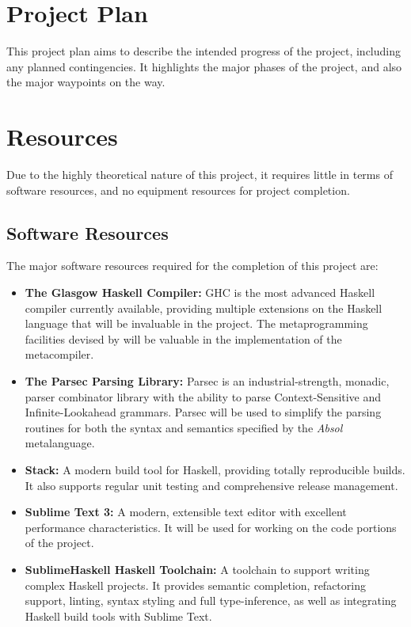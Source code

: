 \documentclass[a4paper,11pt]{report}
\begin{document}
\chapter{Project Plan} %
\label{cha:project_plan}
This project plan aims to describe the intended progress of the project, including any planned contingencies.
It highlights the major phases of the project, and also the major waypoints on the way.



\chapter{Resources} %
\label{cha:resources}
Due to the highly theoretical nature of this project, it requires little in terms of software resources, and no equipment resources for project completion.

\section{Software Resources} %
\label{sec:software_resources}
The major software resources required for the completion of this project are:
\begin{itemize}
    \item \textbf{The Glasgow Haskell Compiler:} GHC is the most advanced Haskell compiler currently available, providing multiple extensions on the Haskell language that will be invaluable in the project.
    The metaprogramming facilities devised by \cite{sheard2002template} will be valuable in the implementation of the metacompiler. 
    \item \textbf{The Parsec Parsing Library:} Parsec is an industrial-strength, monadic, parser combinator library with the ability to parse Context-Sensitive and Infinite-Lookahead grammars.
    Parsec will be used to simplify the parsing routines for both the syntax and semantics specified by the \textit{Absol} metalanguage.
    \item \textbf{Stack:} A modern build tool for Haskell, providing totally reproducible builds. 
    It also supports regular unit testing and comprehensive release management.
    \item \textbf{Sublime Text 3:} A modern, extensible text editor with excellent performance characteristics.
    It will be used for working on the code portions of the project.
    \item \textbf{SublimeHaskell Haskell Toolchain:} A toolchain to support writing complex Haskell projects. 
    It provides semantic completion, refactoring support, linting, syntax styling and full type-inference, as well as integrating Haskell build tools with Sublime Text.
\end{itemize}
\end{document}
